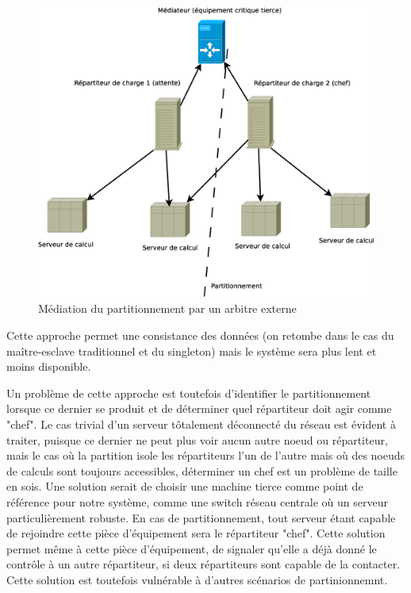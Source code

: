 \begin{figure}
  \includegraphics[width=\linewidth]{Arch_2_part_mediator.eps}
  \caption{Médiation du partitionnement par un arbitre externe}
  \label{fig:arch_2_chef}
\end{figure}

Cette approche permet une consistance des données (on retombe dans le cas du maître-esclave traditionnel
et du singleton) mais le système sera plus lent et moins disponible. 

Un problème de cette approche est toutefois d'identifier le partitionnement lorsque ce dernier se produit et de déterminer quel répartiteur doit agir comme "chef". Le cas trivial d'un 
serveur tôtalement déconnecté du réseau est évident à traiter, puisque ce dernier ne peut plus voir aucun autre noeud ou répartiteur, mais le cas où la partition isole les répartiteurs 
l'un de l'autre mais où des noeuds de calculs sont toujours accessibles, déterminer un chef est un problème de taille en sois. Une solution serait de choisir une machine tierce comme point de 
référence pour notre système, comme une switch réseau centrale où un serveur particulièrement robuste. En cas de partitionnement, tout serveur étant capable de rejoindre cette pièce d'équipement 
sera le répartiteur "chef". Cette solution permet même à cette pièce d'équipement, de signaler qu'elle a déjà donné le contrôle à un autre répartiteur, si deux répartiteurs sont capable de la contacter. 
Cette solution est toutefois vulnérable à d'autres scénarios de partinionnemnt. 

